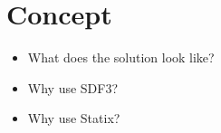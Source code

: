 
\chapter{\label{chap:concept}Concept}

  \begin{itemize}
    \item What does the solution look like?
    \item Why use SDF3?
    \item Why use Statix?
  \end{itemize}
